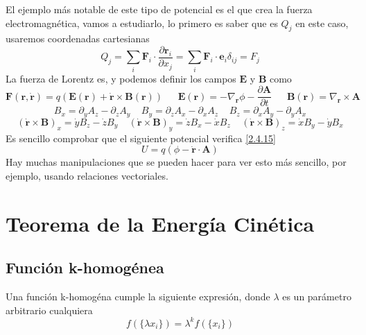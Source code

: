 El ejemplo más notable de este tipo de potencial es el que crea la fuerza electromagnética, vamos a estudiarlo, lo primero es saber que es $Q_j$ en este caso, usaremos coordenadas cartesianas
\begin{equation} \label{2.4.16}
    Q_j = \sum_i \mathbf{F}_i \cdot \frac{\partial \mathbf{r}_i}{\partial x_j} = \sum_i \mathbf{F}_i \cdot \mathbf{e}_i \delta_{ij} = F_j
\end{equation} 
La fuerza de Lorentz es, y podemos definir los campos $\mathbf{E}$ y $\mathbf{B}$ como 
\begin{equation} \label{2.4.17}
    \mathbf{F}(\mathbf{r},\dot{\mathbf{r}}) = q(\mathbf{E}(\mathbf{r})+\dot{\mathbf{r}} \times \mathbf{B}(\mathbf{r})) \ \ \ \ \ \ \ \mathbf{E}(\mathbf{r}) = -\nabla_\mathbf{r} \phi -\frac{\partial \mathbf{A}}{\partial t}  \ \ \ \ \ \ \ \mathbf{B}(\mathbf{r}) = \nabla_\mathbf{r} \times \mathbf{A}
\end{equation} 
\vspace{-10pt}
\[
    B_x = \partial_y A_z - \partial_z A_y \ \ \ \ \ B_y = \partial_z A_x-\partial_x A_z \ \ \ \ \ B_z = \partial_x A_y - \partial_y A_x
\]
\[
    (\dot{\mathbf{r}} \times \mathbf{B})_x= \dot{y}B_z - \dot{z}B_y \ \ \ \ \ (\dot{\mathbf{r}} \times \mathbf{B})_y = \dot{z}B_x - \dot{x}B_z \ \ \ \ \ (\dot{\mathbf{r}} \times \mathbf{B})_z = \dot{x}B_y - \dot{y}B_x
\]
Es sencillo comprobar que el siguiente potencial verifica \eqref{2.4.15}
\begin{equation} \label{2.4.18}
    U = q(\phi -\dot{\mathbf{r}}\cdot \mathbf{A})
\end{equation} 
Hay muchas manipulaciones que se pueden hacer para ver esto más sencillo, por ejemplo, usando relaciones vectoriales.
\section{Teorema de la Energía Cinética}
\subsection{Función k-homogénea}
Una función k-homogéna cumple la siguiente expresión, donde $\lambda$ es un parámetro arbitrario cualquiera
\begin{equation} \label{2.5.1}
    f(\{\lambda x_i\})=\lambda^k f(\{x_i\})
\end{equation} 
\vspace{-35pt}
